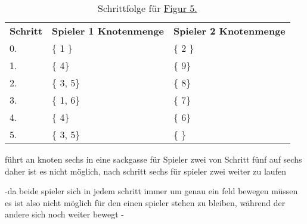 \documentclass[a4paper,10pt,ngerman]{scrartcl}
\begin{document}
    \begin{table}[h!]
        \centering
        \begin{tabular}{lll}
            \textbf{Schritt} & \textbf{Spieler 1 Knotenmenge} & \textbf{Spieler 2 Knotenmenge} \\
            0.               & \{ 1 \}                        & \{ 2 \}                        \\
            1.               & \{  4\}                          & \{  9\}                          \\
            2.               & \{  3, 5\}                       & \{  8\}                          \\
            3.               & \{  1, 6\}                       & \{  7\}                          \\
            4.               & \{  4\}                          & \{  6\}                          \\
            5.               & \{  3, 5\}                       & \{  \}                           \\
        \end{tabular}
        \caption{Schrittfolge für \hyperref[fig:Figure5]{Figur 5.}}
        \label{tab:Table4}
    \end{table}

    führt an knoten sechs in eine sackgasse für Spieler zwei von Schritt fünf auf sechs
    daher ist es nicht möglich, nach schritt sechs für spieler zwei weiter zu laufen

    -da beide spieler sich in jedem schritt immer um genau ein feld bewegen müssen
    es ist also nicht möglich für den einen spieler stehen zu bleiben,
    während der andere sich noch weiter bewegt
    -
\end{document}

